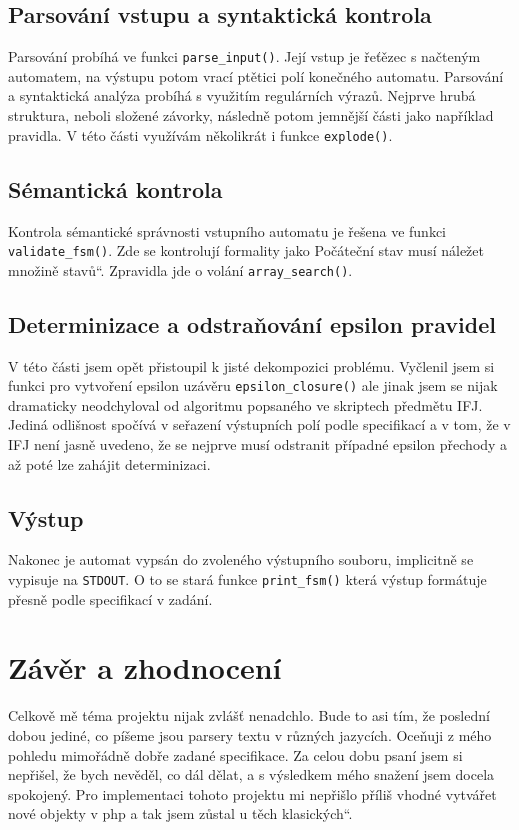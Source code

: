\documentclass[a4paper, 10pt]{article}
\newcommand{\czq}[1]{\quotedblbase #1\textquotedblleft}
\begin{document}
\subsection{Parsování vstupu a syntaktická kontrola}
Parsování probíhá ve funkci \texttt{parse\_input()}. Její vstup je řeťězec s načteným automatem, na výstupu potom vrací ptětici polí konečného automatu. Parsování a syntaktická analýza probíhá s využitím regulárních výrazů. Nejprve hrubá struktura, neboli složené závorky, následně potom jemnější části jako například pravidla. V této části využívám několikrát i funkce \texttt{explode()}. 

\subsection{Sémantická kontrola}
Kontrola sémantické správnosti vstupního automatu je řešena ve funkci \texttt{validate\_fsm()}. Zde se kontrolují formality jako \czq{Počáteční stav musí náležet množině stavů}. Zpravidla jde o volání \texttt{array\_search()}.
\subsection{Determinizace a odstraňování epsilon pravidel}
V této části jsem opět přistoupil k jisté dekompozici problému. Vyčlenil jsem si funkci pro vytvoření epsilon uzávěru \texttt{epsilon\_closure()} ale jinak jsem se nijak dramaticky neodchyloval od algoritmu popsaného ve skriptech předmětu IFJ. Jediná odlišnost spočívá v seřazení výstupních polí podle specifikací a v tom, že v IFJ není jasně uvedeno, že se nejprve musí odstranit případné epsilon přechody a až poté lze zahájit determinizaci.
\subsection{Výstup}
Nakonec je automat vypsán do zvoleného výstupního souboru, implicitně se vypisuje na \texttt{STDOUT}. O to se stará funkce \texttt{print\_fsm()} která výstup formátuje přesně podle specifikací v zadání.
\section{Závěr a zhodnocení}
Celkově mě téma projektu nijak zvlášť nenadchlo. Bude to asi tím, že poslední dobou jediné, co píšeme jsou parsery textu v různých jazycích. Oceňuji z mého pohledu mimořádně dobře zadané specifikace. Za celou dobu psaní jsem si nepřišel, že bych nevěděl, co dál dělat, a s výsledkem mého snažení jsem docela spokojený. Pro implementaci tohoto projektu mi nepřišlo příliš vhodné vytvářet nové objekty v php a tak jsem zůstal u těch \czq{klasických}. 
\end{document}
